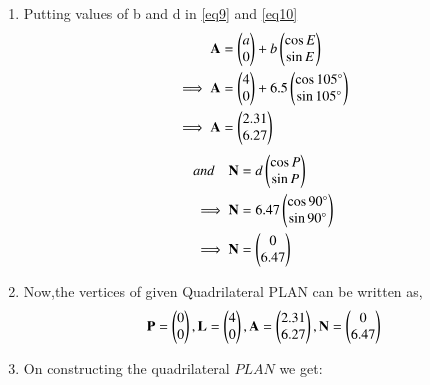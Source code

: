 \documentclass[journal,12pt,twocolumn]{IEEEtran}
\begin{document}
\begin{enumerate}
\begin{proof}
\begin{align}
\\
\implies\norm{\vec{N}}&=d\times\norm{\myvec{\cos 90\degree\\\sin 90\degree}} 
\\
\implies\norm{\vec{N}}&=d
\end{align}
\end{proof}
\item Putting values of b and d in \eqref{eq9} and \eqref{eq10}
\begin{align}
\mathbf{A}&=\begin{pmatrix}a\\0\end{pmatrix} +b \begin{pmatrix}\cos E\\\sin E\end{pmatrix} 
\\
\implies\mathbf{A}&=\begin{pmatrix}4\\0\end{pmatrix} +6.5 \begin{pmatrix}\cos 105\degree\\\sin 105\degree\end{pmatrix} 
\\
\implies\mathbf{A}&=\begin{pmatrix}2.31\\6.27\end{pmatrix}
\end{align}
\begin{align}
and \quad \mathbf{N}&=d \begin{pmatrix}\cos P\\\sin P\end{pmatrix}
\\
\implies\mathbf{N}&=6.47 \begin{pmatrix}\cos 90\degree\\\sin 90\degree\end{pmatrix}
\\
\implies\mathbf{N}&=\begin{pmatrix}0\\6.47\end{pmatrix}
\end{align}
\item Now,the vertices of given Quadrilateral PLAN can be written as,
\begin{align}
\mathbf{P}=\begin{pmatrix}0\\0\end{pmatrix},\mathbf{L} = \begin{pmatrix}4\\0\end{pmatrix}, \mathbf{A}=\begin{pmatrix}2.31\\6.27\end{pmatrix},\mathbf{N}=\begin{pmatrix}0\\6.47\end{pmatrix}
\end{align}
\item On constructing the quadrilateral $PLAN$ we get:
\end{enumerate}
\end{document}
